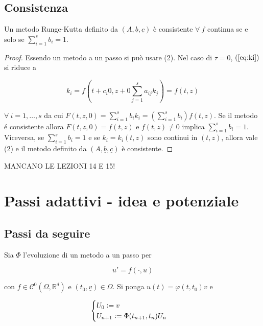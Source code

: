 \documentclass[hidelinks, 10pt]{report}
\begin{document}
\subsection{Consistenza}
Un metodo Runge-Kutta definito da $ (A, \underline{b}, \underline{c}) $ \`e consistente $ \forall\ f $ continua se e solo se $ \sum\limits_{i = 1}^{s} b_{i} = 1 $.

\begin{proof}
Essendo un metodo a un passo si pu\`o usare  (2). Nel caso di $ \tau = 0 $, $ (\ref{eq:ki}) $ si riduce a

\[ k_{i} = f \left(t + c_{i} 0, z + 0 \sum\limits_{j = 1}^{s} a_{ij} k_{j} \right) = f(t, z) \]

$ \forall\ i = 1, \dotsc, s $ da cui $ F(t, z, 0) = \sum\limits_{i = 1}^{s} b_{i} k_{i} = \left( \sum\limits_{i = 1}^{s} b_{i} \right) f(t, z) $. Se il metodo \'e consistente allora $ F(t, z, 0) = f(t, z) $ e $ f(t, z) \ne 0 $ implica $ \sum\limits_{i = 1}^{s} b_{i} = 1 $. Viceversa, se $ \sum\limits_{i = 1}^{s} b_{i} = 1 $ e se $ k_{i} = k_{i} (t, z) $ sono continui in $ (t, z) $, allora vale  (2)  e il metodo definito da $ (A, \underline{b}, \underline{c}) $ \`e consistente.
\end{proof}


										MANCANO LE LEZIONI 14 E 15!


\section{Passi adattivi - idea e potenziale}	\label{section:16}
\subsection{Passi da seguire}

Sia $ \Phi $ l'evoluzione di un metodo a un passo per

\[ u' = f(\cdot, u) \]

con $ f \in \mathcal{C}^{0} (\Omega, \mathbb{R}^{d}) $ e $ (t_{0}, \underline{v}) \in \Omega $. Si ponga $ u(t) = \varphi(t, t_{0}) v $ e

\[
\begin{cases}
U_{0} \vcentcolon= v \\
U_{n + 1} \vcentcolon= \Phi(t_{n + 1}, t_{n}) U_{n}
\end{cases}
\]
\end{document}
